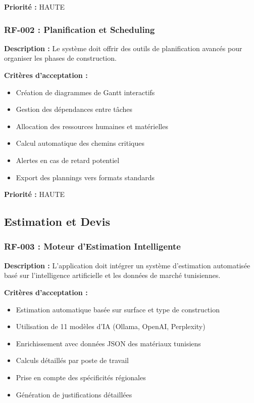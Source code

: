 \textbf{Priorité :} HAUTE

\subsubsection{RF-002 : Planification et Scheduling}

\textbf{Description :} Le système doit offrir des outils de planification avancés pour organiser les phases de construction.

\textbf{Critères d'acceptation :}
\begin{itemize}
    \item Création de diagrammes de Gantt interactifs
    \item Gestion des dépendances entre tâches
    \item Allocation des ressources humaines et matérielles
    \item Calcul automatique des chemins critiques
    \item Alertes en cas de retard potentiel
    \item Export des plannings vers formats standards
\end{itemize}

\textbf{Priorité :} HAUTE

\subsection{Estimation et Devis}

\subsubsection{RF-003 : Moteur d'Estimation Intelligente}

\textbf{Description :} L'application doit intégrer un système d'estimation automatisée basé sur l'intelligence artificielle et les données de marché tunisiennes.

\textbf{Critères d'acceptation :}
\begin{itemize}
    \item Estimation automatique basée sur surface et type de construction
    \item Utilisation de 11 modèles d'IA (Ollama, OpenAI, Perplexity)
    \item Enrichissement avec données JSON des matériaux tunisiens
    \item Calculs détaillés par poste de travail
    \item Prise en compte des spécificités régionales
    \item Génération de justifications détaillées
\end{itemize}

